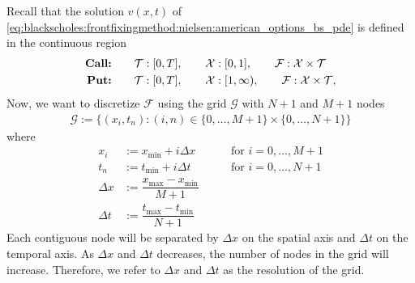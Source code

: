 Recall that the solution $v(x,t)$ of 
\eqref{eq:blackscholes:frontfixingmethod:nielsen:american_options_bs_pde} is defined in the continuous region 
\begin{subequations}
  \label{eq:finitedifferencesschemes:overview:continous_domain}
\begin{align}
  \text{\textbf{Call:}} \qquad& \mathcal{T}: [0, T], \qquad \mathcal{X}: [0, 1], \qquad  \mathcal{F}: \mathcal{X} \times \mathcal{T} \\
  \text{\textbf{Put:}} \qquad& \mathcal{T}:[0, T], \qquad \mathcal{X}:[1, \infty), \qquad \mathcal{F}: \mathcal{X} \times \mathcal{T},
\end{align}
\end{subequations}
Now, we want to discretize $\mathcal{F}$ using the grid $\mathcal{G}$ with $N+1$ and $M+1$ nodes
\begin{align}
  \label{eq:finitedifferencesschemes:overview:grid}
  \mathcal{G} := \{(x_i, t_n): (i, n) \in \{0,\dots,M+1\}\times\{0,\dots,N+1\}\}
\end{align}
where
\begin{align}
  \label{eq:finitedifferencesschemes:overview:grid_2}
  x_i &:= x_{\text{min}} + i\Delta x &  \qquad \text{for $i = 0,\dots, M+1$} \\
  t_n &:= t_{\text{min}} + i{\Delta t} & \qquad \text{for $i = 0,\dots, N+1$} \\
  \Delta{x} &:= \dfrac{x_{\text{max}} - x_{\text{min}}}{M+1} \\ 
  \Delta{t} &:= \dfrac{t_{\text{max}} - t_{\text{min}}}{N+1}
\end{align}
Each contiguous node will be separated by $\Delta{x}$ on the spatial axis and $\Delta{t}$ on the temporal axis. As $\Delta{x}$ and $\Delta{t}$ decreases, the number of nodes in the grid will increase. Therefore, we refer to $\Delta{x}$ and $\Delta{t}$ as the resolution of the grid.
